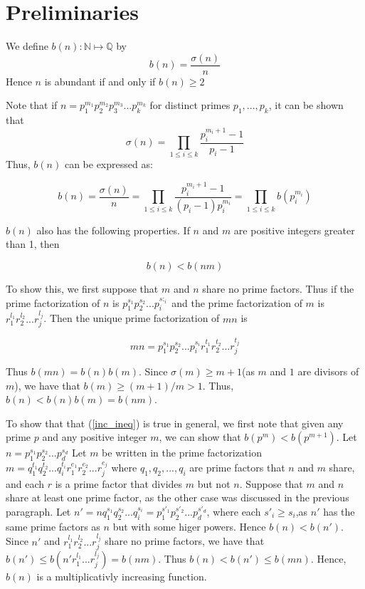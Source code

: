 \documentclass[../paper.tex]{article}
\begin{document}
\section{Preliminaries}

We define $b(n): \mathbb{N} \mapsto \mathbb{Q}$ by
%
$$b(n) = \frac{\sigma(n)}{n} $$
%
Hence $n$ is abundant if and only if $b(n) \geq 2$

Note that if $n=p_1^{m_1}p_2^{m_2}p_3^{m_3}...p_{k}^{m_k}$ 
for distinct primes $p_1, ..., p_k$, it can be shown that 
%
$$\sigma(n) = \prod_{1 \leq i \leq k} \frac{p_i^{m_i + 1} -1}{p_i -1}$$
%
Thus, $b(n)$ can be expressed as:


\begin{equation}\label{b_stuff}
  b(n) = \frac{\sigma(n)}{n} = \prod_{1 \leq i \leq k} 
  \frac{p_i^{m_i + 1} -1}{(p_i -1)p_{i}^{m_{i}}}
  =\prod_{1 \leq i \leq k} b(p_i^{m_i})
\end{equation}

$b(n)$ also has the following properties. If $n$ and $m$ are positive
integers greater than 1, then 

\begin{equation}\label{inc_ineq}
  b(n) < b(nm) %
\end{equation}

To show this, we first suppose that $m$ and $n$ share no prime factors.
Thus if the prime factorization of $n$ is $p_1^{s_1} p_2^{s_2} ... p_i^{s:_i}$ 
and the prime factorization of $m$ is $r_1^{l_1} r_2^{l_2} ... r_j^{l_j}$.
Then the unique prime factorization of $mn$ is 

$$mn = p_1^{s_1} p_2^{s_2} ... p_i^{s_i} r_1^{t_1} r_2^{t_2} ... r_j^{t_j}$$

Thus $b(mn) = b(n)b(m)$. Since $\sigma(m) \geq m + 1$(as $m$ and 
$1$ are divisors of $m$), we have that $b(m) \geq (m + 1) / m > 1$.
Thus,
$b(n) < b(n)b(m) = b(nm)$. 


To show that that (\ref{inc_ineq}) is true in general,
we first note that given any prime $p$ and
any positive integer $m$, we can show that $b(p^m) < b(p^{m + 1})$.
Let $n = p_1^{s_1} p_2^{s_2}... p_d^{s_d}$ 
Let $m$ be written in the prime factorization 
$m = q_1^{t_1} q_2^{t_2} ... q_i^{t_i} 
r_1^{e_1} r_2^{e_2} ... r_j^{e_j}$ where 
$q_1, q_2, ..., q_i$ are prime factors that $n$ and $m$ share,
and each $r$ is a prime factor that divides $m$ but not $n$.
Suppose that $m$ and $n$ share at least one prime factor, as the 
other case was discussed in the previous paragraph.
%
Let $n' = n q_1^{s_1} q_2^{s_2} ... q_i^{s_i} =
p_1^{s'_1} p_2^{s'_2} ... p_d^{s'_d}$, where each $s'_i \geq s_i$,as
$n'$ has the same prime factors as $n$ but with some higer powers.
Hence $b(n) < b(n')$. Since $n'$ and $r_1^{l_1} r_2^{l_2} ... r_j^{l_j}$
share no prime factors, we have that 
$b(n') \leq b(n' r_1^{l_1} ... r_j^{l_j}) = b(nm)$.
Thus $b(n) < b(n') \leq b(mn)$. Hence, $b(n)$ is a 
multiplicativly increasing function.
\\
\end{document}
